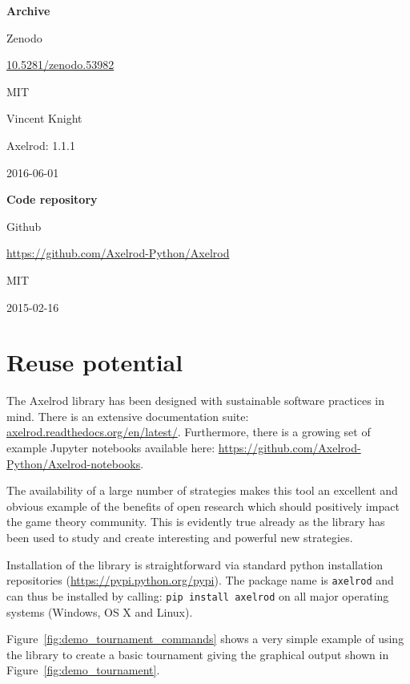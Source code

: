 \documentclass{jors}
\begin{document}
{\bf Archive}

\begin{description}[noitemsep,topsep=0pt]
    \item[Name:] Zenodo
    \item[Persistent identifier:]
\href{https://zenodo.org/record/53982}{10.5281/zenodo.53982}
    \item[Licence:] MIT
    \item[Publisher:]  Vincent Knight
    \item[Version published:] Axelrod: 1.1.1
    \item[Date published:] 2016-06-01
\end{description}

{\bf Code repository}

\begin{description}[noitemsep,topsep=0pt]
    \item[Name:] Github
    \item[Identifier:] \url{https://github.com/Axelrod-Python/Axelrod}
    \item[Licence:] MIT
    \item[Date published:] 2015-02-16
\end{description}

\section*{Reuse potential}\label{sec:reuse}

The Axelrod library has been designed with sustainable software practices in
mind. There is an extensive documentation suite:
\url{axelrod.readthedocs.org/en/latest/}. Furthermore, there is a growing set
of example Jupyter notebooks available here:
\url{https://github.com/Axelrod-Python/Axelrod-notebooks}.

The availability of a large number of strategies makes this
tool an excellent and obvious example of the benefits of open research which
should positively impact the game theory community.
This is evidently true already as the library has been used to study and create
interesting and powerful new strategies.

Installation of the library is straightforward via standard python installation
repositories (\url{https://pypi.python.org/pypi}). The package name is
\texttt{axelrod} and can thus be installed by calling: \texttt{pip install
axelrod} on all major operating systems (Windows, OS X and Linux).

Figure~\ref{fig:demo_tournament_commands} shows a very simple example of using
the library to create a basic tournament giving the graphical output shown in
Figure~\ref{fig:demo_tournament}.
\end{document}

